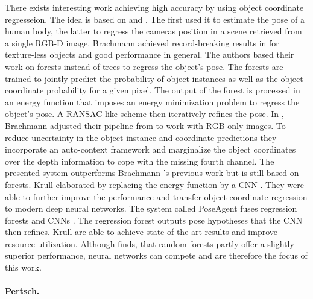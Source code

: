 There exists interesting work achieving high accuracy by using object coordinate regresseion. The idea is based on \cite{tsharp} and \cite{firstcoordinateregression}. The first used it to estimate the pose of a human body, the latter to regress the cameras position in a scene retrieved from a single RGB-D image.
\nnewline
Brachmann \etal achieved record-breaking results in \cite{brachmann1} for texture-less objects and good performance in general. The authors based their work on forests instead of trees to regress the object's pose. The forests are trained to jointly predict the probability of object instances as well as the object coordinate probability for a given pixel. The output of the forest is processed in an energy function that imposes an energy minimization problem to regress the object's pose. A RANSAC-like scheme then iteratively refines the pose.
\nnewline
In \cite{brachmann2}, Brachmann \etal adjusted their pipeline from \cite{brachmann1} to work with RGB-only images. To reduce uncertainty in the object instance and coordinate predictions they incorporate an auto-context framework and marginalize the object coordinates over the depth information to cope with the missing fourth channel. The presented system outperforms Brachmann \etal's previous work but is still based on forests. 
\nnewline
Krull \etal elaborated \cite{brachmann1} by replacing the energy function by a CNN \cite{akrull}. They were able to further improve the performance and transfer object coordinate regression to modern deep neural networks. The system called PoseAgent fuses regression forests and CNNs \cite{poseagent}. The regression forest outputs pose hypotheses that the CNN then refines. Krull \etal are able to achieve state-of-the-art results and improve resource utilization. Although \cite{trees-vs-cnn} finds, that random forests partly offer a slightly superior performance, neural networks can compete and are therefore the focus of this work.

\paragraph{Pertsch.}

